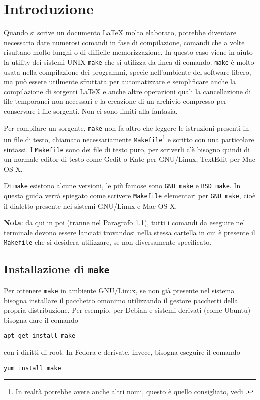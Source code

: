 \cleardoublepage
\chapter{Introduzione}
\label{cha:introduzione}

Quando si scrive un documento \LaTeX{}
molto elaborato, potrebbe diventare necessario dare numerosi comandi in fase di
compilazione, comandi che a volte risultano molto lunghi o di difficile
memorizzazione.  In questo caso viene in aiuto la utility dei sistemi UNIX
\verb|make| che si utilizza da linea di comando. \verb|make| è molto usata nella
compilazione dei programmi, specie nell'ambiente del software libero, ma può
essere utilmente sfruttata per automatizzare e semplificare anche la
compilazione di sorgenti \LaTeX{}
e anche altre operazioni quali la cancellazione di file temporanei non necessari
e la creazione di un archivio compresso per conservare i file sorgenti.  Non ci
sono limiti alla fantasia.

Per compilare un sorgente, \verb|make| non fa altro che leggere le istruzioni
presenti in un file di testo, chiamato necessariamente
\verb|Makefile|\footnote{In realtà potrebbe avere anche altri nomi, questo è
  quello consigliato, vedi \textcite[12]{gnu:make}.}
e scritto con una particolare sintassi.  I \verb|Makefile| sono dei file di
testo puro, per scriverli c'è bisogno quindi di un normale editor di testo come
Gedit o Kate per GNU/Linux, TextEdit per Mac OS X.

Di \verb|make| esistono alcune versioni, le più famose sono \verb|GNU make| e
\verb|BSD make|.  In questa guida verrà spiegato come scrivere \verb|Makefile|
elementari per \verb|GNU make|, cioè il dialetto presente nei sistemi GNU/Linux
e Mac OS X.

\textbf{Nota}: da qui in poi (tranne nel Paragrafo \ref{sec:installazione}),
tutti i comandi da eseguire nel terminale devono essere lanciati trovandosi
nella stessa cartella in cui è presente il \verb|Makefile| che si desidera
utilizzare, se non diversamente specificato.


\section{Installazione di \texttt{make}}
\label{sec:installazione}

Per ottenere \verb|make| in ambiente GNU/Linux, se non già presente nel sistema
bisogna installare il pacchetto omonimo utilizzando il gestore pacchetti della
propria distribuzione.  Per esempio, per Debian e sistemi derivati (come Ubuntu)
bisogna dare il comando
\begin{verbatim}
apt-get install make
\end{verbatim}
con i diritti di root.  In Fedora e derivate, invece, bisogna eseguire il
comando
\begin{verbatim}
yum install make
\end{verbatim}

